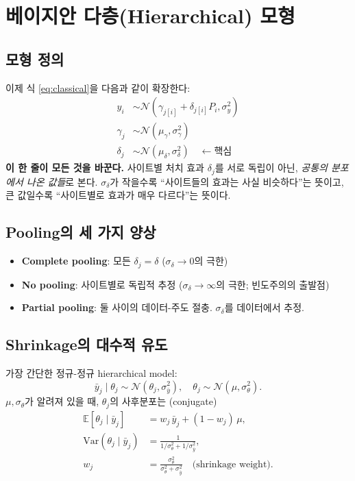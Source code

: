 \documentclass[11pt,a4paper]{article}
\newcommand{\E}{\mathbb{E}}
\newcommand{\Var}{\mathrm{Var}}
\newcommand{\Normal}{\mathcal{N}}
\begin{document}
\section{베이지안 다층(Hierarchical) 모형}
\label{sec:hierarchical}

\subsection{모형 정의}

이제 식 \eqref{eq:classical}을 다음과 같이 확장한다:
\begin{align}
  y_i      &\sim \Normal(\gamma_{j[i]} + \delta_{j[i]} P_i, \sigma_y^2) \\
  \gamma_j &\sim \Normal(\mu_\gamma, \sigma_\gamma^2) \\
  \delta_j &\sim \Normal(\mu_\delta, \sigma_\delta^2)  \quad \leftarrow \text{핵심}
\end{align}
\textbf{이 한 줄이 모든 것을 바꾼다.}
사이트별 처치 효과 $\delta_j$를 서로 독립이 아닌, \emph{공통의 분포에서 나온 값들}로 본다.
$\sigma_\delta$가 작을수록 ``사이트들의 효과는 사실 비슷하다''는 뜻이고, 큰 값일수록 ``사이트별로 효과가 매우 다르다''는 뜻이다.

\subsection{Pooling의 세 가지 양상}

\begin{itemize}
  \item \textbf{Complete pooling}: 모든 $\delta_j = \delta$ ($\sigma_\delta \to 0$의 극한)
  \item \textbf{No pooling}: 사이트별로 독립적 추정 ($\sigma_\delta \to \infty$의 극한; 빈도주의의 출발점)
  \item \textbf{Partial pooling}: 둘 사이의 데이터-주도 절충. $\sigma_\delta$를 데이터에서 추정.
\end{itemize}

\subsection{Shrinkage의 대수적 유도}

가장 간단한 정규-정규 hierarchical model:
\[
  \bar y_j \mid \theta_j \sim \Normal(\theta_j, \sigma_{\bar y}^2),
  \quad \theta_j \sim \Normal(\mu, \sigma_\theta^2).
\]
$\mu, \sigma_\theta$가 알려져 있을 때, $\theta_j$의 사후분포는 (conjugate)
\begin{align}
  \E[\theta_j \mid \bar y_j] &= w_j\, \bar y_j + (1-w_j)\,\mu, \\
  \Var(\theta_j \mid \bar y_j) &= \tfrac{1}{1/\sigma_\theta^2+1/\sigma_{\bar y}^2}, \\
  w_j &= \tfrac{\sigma_\theta^2}{\sigma_\theta^2 + \sigma_{\bar y}^2}\quad\text{(shrinkage weight)}.
\end{align}
\end{document}
